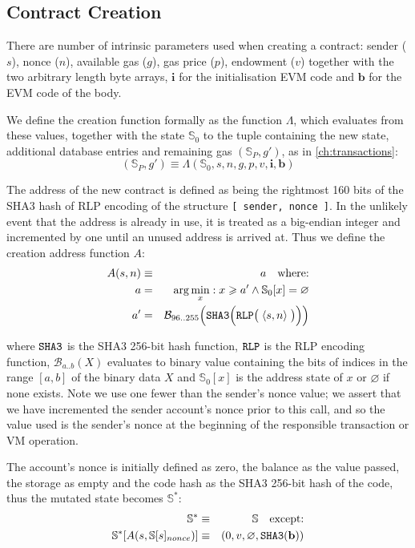 \documentclass[9pt,oneside]{amsart}
\begin{document}
\begin{multicols}{2}
\section{Contract Creation} \label{ch:create}

There are number of intrinsic parameters used when creating a contract: sender ($s$), nonce ($n$), available gas ($g$), gas price ($p$), endowment ($v$) together with the two arbitrary length byte arrays, $\mathbf{i}$ for the initialisation EVM code and $\mathbf{b}$ for the EVM code of the body.

We define the creation function formally as the function $\Lambda$, which evaluates from these values, together with the state $\mathbb{S}_0$ to the tuple containing the new state, additional database entries and remaining gas $(\mathbb{S}_P, g')$, as in \ref{ch:transactions}:
\begin{equation}
(\mathbb{S}_P, g') \equiv \Lambda(\mathbb{S}_0, s, n, g, p, v, \mathbf{i}, \mathbf{b})
\end{equation}

The address of the new contract is defined as being the rightmost 160 bits of the SHA3 hash of RLP encoding of the structure \texttt{[ sender, nonce ]}. In the unlikely event that the address is already in use, it is treated as a big-endian integer and incremented by one until an unused address is arrived at. Thus we define the creation address function $A$:
\begin{eqnarray}
A(s, n) & \equiv & a \quad \text{where:} \\
a & = & \arg \min_x : x \geqslant a' \wedge \mathbb{S}_0[x] = \varnothing \\
a' & = & \mathcal{B}_{96..255}\Big(\mathtt{\tiny SHA3}\Big(\mathtt{\tiny RLP}\big(\;\langle s, n\rangle\;\big)\Big)\Big)
\end{eqnarray}

where $\mathtt{\tiny SHA3}$ is the SHA3 256-bit hash function, $\mathtt{\tiny RLP}$ is the RLP encoding function, $\mathcal{B}_{a..b}(X)$ evaluates to binary value containing the bits of indices in the range $[a, b]$ of the binary data $X$ and $\mathbb{S}_0[x]$ is the address state of $x$ or $\varnothing$ if none exists. Note we use one fewer than the sender's nonce value; we assert that we have incremented the sender account's nonce prior to this call, and so the value used is the sender's nonce at the beginning of the responsible transaction or VM operation.

The account's nonce is initially defined as zero, the balance as the value passed, the storage as empty and the code hash as the SHA3 256-bit hash of the code, thus the mutated state becomes $\mathbb{S}^*$:
\begin{eqnarray}
\mathbb{S}^* & \equiv & \mathbb{S} \quad \text{except:} \\
\mathbb{S}^*[A(s, \mathbb{S}[s]_{nonce})] & \equiv & ( 0, v, \varnothing, \mathtt{\tiny SHA3}(\mathbf{b}) )
\end{eqnarray}


\end{multicols}
\end{document}
